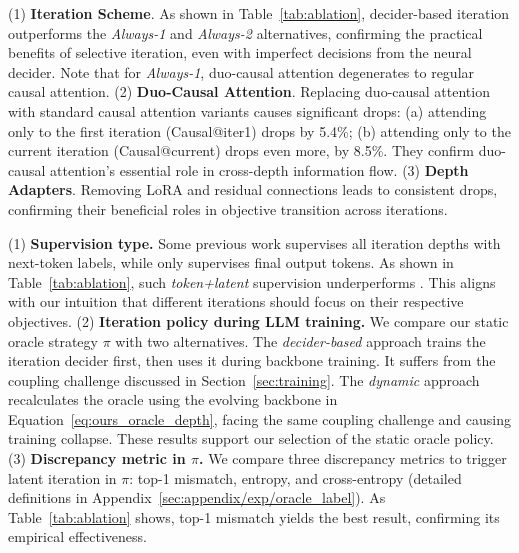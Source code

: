 (1) \textbf{Iteration Scheme}.
As shown in Table~\ref{tab:ablation}, decider-based iteration outperforms the \textit{Always-1} and \textit{Always-2} alternatives, confirming the practical benefits of selective iteration, even with imperfect decisions from the neural decider. Note that for \textit{Always-1}, duo-causal attention degenerates to regular causal attention.
(2) \textbf{Duo-Causal Attention}.
Replacing duo-causal attention with standard causal attention variants causes significant drops:
(a) attending only to the first iteration (Causal@iter1) drops by 5.4\%;
(b) attending only to the current iteration (Causal@current) drops even more, by 8.5\%.
They confirm duo-causal attention's essential role in cross-depth information flow.
(3) \textbf{Depth Adapters}.
Removing LoRA and residual connections leads to consistent drops, confirming their beneficial roles in objective transition across iterations.

(1) \textbf{Supervision type.} 
Some previous work supervises all iteration depths with next-token labels, while \name only supervises final output tokens.
As shown in Table~\ref{tab:ablation}, such \textit{token+latent} supervision underperforms \name. This aligns with our intuition that different iterations should focus on their respective objectives.
(2) \textbf{Iteration policy during LLM training.}
We compare our static oracle strategy $\pi$ with two alternatives.
The \textit{decider-based} approach trains the iteration decider first, then uses it during backbone training. It suffers from the coupling challenge discussed in Section~\ref{sec:training}.
The \textit{dynamic} approach recalculates the oracle using the evolving backbone in Equation~\ref{eq:ours_oracle_depth}, facing the same coupling challenge and causing training collapse. 
These results support our selection of the static oracle policy.
(3) \textbf{Discrepancy metric in $\pi$.}
We compare three discrepancy metrics to trigger latent iteration in $\pi$: top-1 mismatch, entropy, and cross-entropy (detailed definitions in Appendix~\ref{sec:appendix/exp/oracle_label}).
As Table~\ref{tab:ablation} shows, top-1 mismatch yields the best result, confirming its empirical effectiveness.

